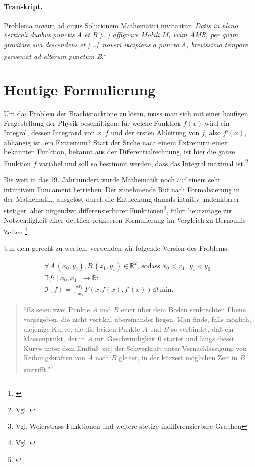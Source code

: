 \paragraph{Transkript.} Problema novum ad cujus Solutionem Mathematici invitantur.
\textit {Datis in plano verticali duobus punctis A et B [...] affignare Mobili M, viam AMB, per quam gravitare sua descendens et [...] moveri incipiens a puncto A, brevissimo tempore perveniat ad alterum punctum B.}\footnote{\cite{acta}}


\section{Heutige Formulierung}
Um das Problem der Brachistochrone zu lösen, muss man sich mit einer häufigen Fragestellung der Physik beschäftigen: für welche Funktion $f(x)$ wird ein Integral, dessen Integrand von $x$, $f$ und der ersten Ableitung von $f$, also $f'(x)$, abhängig ist, ein Extremum? 
Statt der Suche nach einem Extremum einer bekannten Funktion, bekannt aus der Differentialrechnung, ist hier die ganze Funktion $f$ variabel und soll so bestimmt werden, dass das Integral maximal ist.\footnote{Vgl. \cite{lehrbuch}}

Bis weit in das 19. Jahrhundert wurde Mathematik noch auf einem sehr intuitivem Fundament betrieben. 
Der zunehmende Ruf nach Formalisierung in der Mathematik, ausgelöst durch die Entdeckung damals intuitiv undenkbarer stetiger, aber nirgendwo differenzierbarer Funktionen\footnote{Vgl. Weierstrass-Funktionen und weitere stetige indifferenzierbare Graphen}, führt heutzutage zur Notwendigkeit einer deutlich präziseren Formulierung im Vergleich zu Bernoullis Zeiten.\footnote{Vgl. \cite{georgi}}

Um dem gerecht zu werden, verwenden wir folgende Version des Problems:


\begin{equation}\label{(1.1)}
  \begin{gathered}
   \forall \,A\,(x_0,y_0), B\,(x_1,y_1) \in \mathbb{R}^2, \,\text{sodass } x_0 < x_1,\, y_1<y_0 \\
   \exists \, f:[x_0,x_1] \to \mathbb{R}: \\
   \mathfrak{I}(f)=\int_{x_0}^{x_1}F\left(x,f\left(x\right),
   f'\left(x\right)\right) \, \dd t\, \text{min.}
  \end{gathered}
\end{equation}


\begin{quote}
 \textquotedblleft Es seien zwei Punkte $A$ und $B$ einer über dem Boden senkrechten Ebene vorgegeben, die nicht vertikal übereinander liegen. Man finde, falls möglich, diejenige Kurve, die die beiden Punkte $A$ und $B$ so verbindet, daß ein Massenpunkt, der in $A$ mit Geschwindigkeit $0$ startet und längs dieser Kurve unter dem Einfluß [sic] der Schwerkraft unter Vernachlässigung von Reibungskräften von $A$ nach $B$ gleitet, in der kürzest möglichen Zeit in $B$ eintrifft.\textquotedblright  \footnote{\cite{weihnachtsübung}}
\end{quote}

